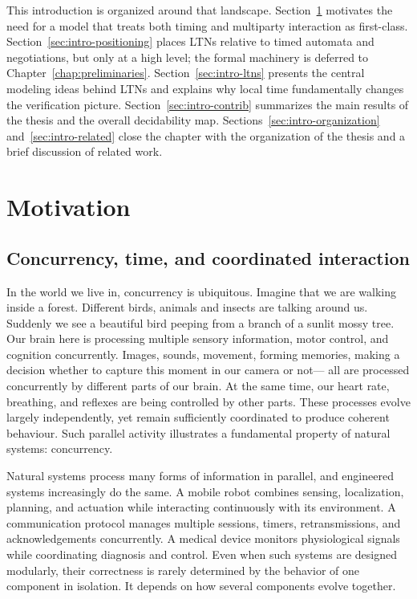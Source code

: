 This introduction is organized around that landscape. Section~\ref{sec:intro-motivation} motivates the need for a model that treats both timing and multiparty interaction as first-class. Section~\ref{sec:intro-positioning} places LTNs relative to timed automata and negotiations, but only at a high level; the formal machinery is deferred to Chapter~\ref{chap:preliminaries}. Section~\ref{sec:intro-ltns} presents the central modeling ideas behind LTNs and explains why local time fundamentally changes the verification picture. Section~\ref{sec:intro-contrib} summarizes the main results of the thesis and the overall decidability map. Sections~\ref{sec:intro-organization} and~\ref{sec:intro-related} close the chapter with the organization of the thesis and a brief discussion of related work.


\section{Motivation}
\label{sec:intro-motivation}

\subsection{Concurrency, time, and coordinated interaction}

In the world we live in, concurrency is ubiquitous. Imagine that we are walking inside a forest. Different birds, animals and insects are talking around us. Suddenly we see a beautiful bird peeping from a branch of a sunlit mossy tree. Our brain here is processing multiple sensory information, motor control, and cognition concurrently. Images, sounds, movement, forming memories, making a decision whether to capture this moment in our camera or not--- all are processed concurrently by different parts of our brain. At the same time, our heart rate, breathing, and reflexes are being controlled by other parts. These processes evolve largely independently, yet remain sufficiently coordinated to produce coherent behaviour. Such parallel activity illustrates a fundamental property of natural systems: concurrency. 

Natural systems process many forms of information in parallel, and engineered systems increasingly do the same. A mobile robot combines sensing, localization, planning, and actuation while interacting continuously with its environment. A communication protocol manages multiple sessions, timers, retransmissions, and acknowledgements concurrently. A medical device monitors physiological signals while coordinating diagnosis and control. Even when such systems are designed modularly, their correctness is rarely determined by the behavior of one component in isolation. It depends on how several components evolve together.

